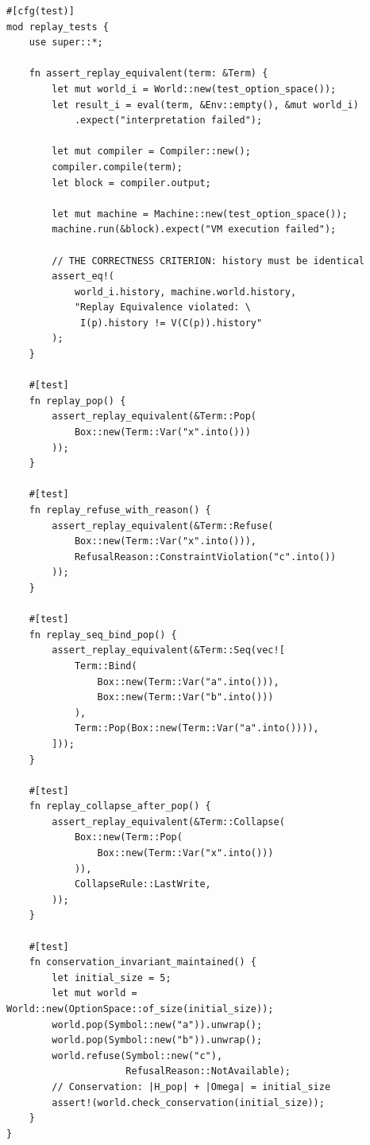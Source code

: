 \documentclass[12pt, a4paper, openany]{book}
\theoremstyle{plain}
\theoremstyle{definition}
\theoremstyle{remark}
\begin{document}
\begin{lstlisting}[style=rust, caption={Replay equivalence verification}]
#[cfg(test)]
mod replay_tests {
    use super::*;

    fn assert_replay_equivalent(term: &Term) {
        let mut world_i = World::new(test_option_space());
        let result_i = eval(term, &Env::empty(), &mut world_i)
            .expect("interpretation failed");

        let mut compiler = Compiler::new();
        compiler.compile(term);
        let block = compiler.output;

        let mut machine = Machine::new(test_option_space());
        machine.run(&block).expect("VM execution failed");

        // THE CORRECTNESS CRITERION: history must be identical
        assert_eq!(
            world_i.history, machine.world.history,
            "Replay Equivalence violated: \
             I(p).history != V(C(p)).history"
        );
    }

    #[test]
    fn replay_pop() {
        assert_replay_equivalent(&Term::Pop(
            Box::new(Term::Var("x".into()))
        ));
    }

    #[test]
    fn replay_refuse_with_reason() {
        assert_replay_equivalent(&Term::Refuse(
            Box::new(Term::Var("x".into())),
            RefusalReason::ConstraintViolation("c".into())
        ));
    }

    #[test]
    fn replay_seq_bind_pop() {
        assert_replay_equivalent(&Term::Seq(vec![
            Term::Bind(
                Box::new(Term::Var("a".into())),
                Box::new(Term::Var("b".into()))
            ),
            Term::Pop(Box::new(Term::Var("a".into()))),
        ]));
    }

    #[test]
    fn replay_collapse_after_pop() {
        assert_replay_equivalent(&Term::Collapse(
            Box::new(Term::Pop(
                Box::new(Term::Var("x".into()))
            )),
            CollapseRule::LastWrite,
        ));
    }

    #[test]
    fn conservation_invariant_maintained() {
        let initial_size = 5;
        let mut world = World::new(OptionSpace::of_size(initial_size));
        world.pop(Symbol::new("a")).unwrap();
        world.pop(Symbol::new("b")).unwrap();
        world.refuse(Symbol::new("c"),
                     RefusalReason::NotAvailable);
        // Conservation: |H_pop| + |Omega| = initial_size
        assert!(world.check_conservation(initial_size));
    }
}
\end{lstlisting}
\end{document}
